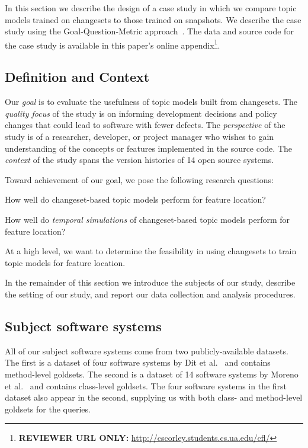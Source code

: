 
In this section we describe the design of a case study in which we compare
topic models trained on changesets to those trained on snapshots.  We describe
the case study using the Goal-Question-Metric approach~\cite{Basili-etal:94}.
The data and source code for the case study is available in this paper's online
appendix\footnote{\textbf{REVIEWER URL ONLY:}
\url{http://cscorley.students.cs.ua.edu/cfl/}}.

\subsection{Definition and Context}

Our \textit{goal} is to evaluate the usefulness of topic models built
from changesets.
The \textit{quality focus} of the study is on informing development
decisions and policy changes that could lead to software with fewer
defects.
The \textit{perspective} of the study is of a researcher, developer, or
project manager who wishes to gain understanding of the concepts or
features implemented in the source code.
The \textit{context} of the study spans the version histories of 14
open source systems.

Toward achievement of our goal, we pose the following research questions:
\begin{description}[font=\itshape\mdseries,leftmargin=10mm,style=sameline]
    \item[RQ1] How well do changeset-based topic models perform for feature location?
    \item[RQ2] How well do \emph{temporal simulations} of changeset-based topic models perform for feature location?
\end{description}
At a high level, we want to determine the feasibility in using changesets
to train topic models for feature location.

In the remainder of this section we introduce the subjects of our study,
describe the setting of our study, and report our data collection and analysis procedures.


\subsection{Subject software systems}

All of our subject software systems come from two publicly-available
datasets.  The first is a dataset of four software systems by Dit et
al.~\cite{Dit:2013} and contains method-level goldsets.  The second is
a dataset of 14 software systems by Moreno et
al.~\cite{Moreno:2014} and contains class-level goldsets. The four
software systems in the first dataset also appear in the second,
supplying us with both class- and method-level goldsets for the queries.

